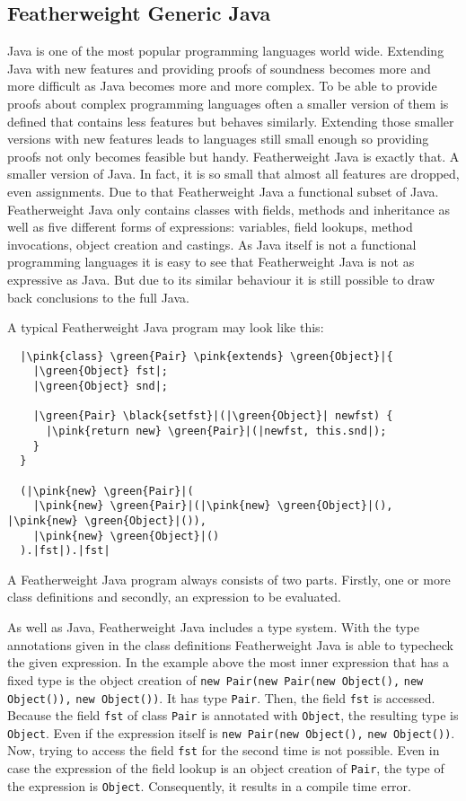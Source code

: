 \subsection{Featherweight Generic Java}
Java is one of the most popular programming languages world wide. Extending Java with new features and providing proofs of soundness becomes more and more difficult as Java becomes more and more complex.
To be able to provide proofs about complex programming languages often a smaller version of them is defined that contains less features but behaves similarly.
Extending those smaller versions with new features leads to languages still small enough so providing proofs not only becomes feasible but handy.
Featherweight Java is exactly that. A smaller version of Java. In fact, it is so small that almost all features are dropped, even assignments. Due to that Featherweight Java a functional subset of Java.
Featherweight Java only contains classes with fields, methods and inheritance as well as five different forms of expressions: variables, field lookups, method invocations, object creation and castings.
As Java itself is not a functional programming languages it is easy to see that Featherweight Java is not as expressive as Java. But due to its similar behaviour it is still possible to draw back conclusions to the full Java.

A typical Featherweight Java program may look like this:

\begin{verbatim}
  |\pink{class} \green{Pair} \pink{extends} \green{Object}|{
    |\green{Object} fst|;
    |\green{Object} snd|;

    |\green{Pair} \black{setfst}|(|\green{Object}| newfst) {
      |\pink{return new} \green{Pair}|(|newfst, this.snd|);
    }
  }

  (|\pink{new} \green{Pair}|(
    |\pink{new} \green{Pair}|(|\pink{new} \green{Object}|(), |\pink{new} \green{Object}|()),
    |\pink{new} \green{Object}|()
  ).|fst|).|fst|
\end{verbatim}

A Featherweight Java program always consists of two parts. Firstly, one or more class definitions and secondly, an expression to be evaluated.

As well as Java, Featherweight Java includes a type system. With the type annotations given in the class definitions Featherweight Java is able to typecheck the given expression.
In the example above the most inner expression that has a fixed type is the object creation of \verb|new Pair(new Pair(new Object(),| \verb|new Object()),| \verb|new Object())|. It has type \verb|Pair|.
Then, the field \verb|fst| is accessed. Because the field \verb|fst| of class \verb|Pair| is annotated with \verb|Object|, the resulting type is \verb|Object|. Even if the expression itself is \verb|new Pair(new Object(),| \verb|new Object())|.
Now, trying to access the field \verb|fst| for the second time is not possible. Even in case the expression of the field lookup is an object creation of \verb|Pair|, the type of the expression is \verb|Object|. Consequently, it results in a compile time error.

